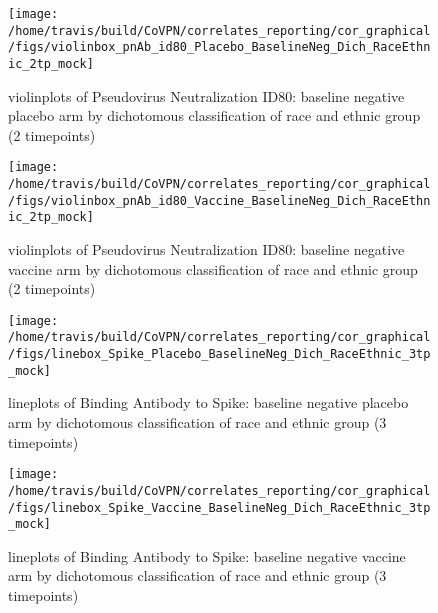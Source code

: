 \documentclass[]{book}
\theoremstyle{definition}
\theoremstyle{definition}
\theoremstyle{definition}
\newcommand{\1}{\mathbbm{1}}
\begin{document}
\clearpage
\begin{figure}[H]

{\centering \texttt{[image: /home/travis/build/CoVPN/correlates\_reporting/cor\_graphical/figs/violinbox\_pnAb\_id80\_Placebo\_BaselineNeg\_Dich\_RaceEthnic\_2tp\_mock]} 

}

\caption{violinplots of Pseudovirus Neutralization ID80: baseline negative placebo arm by dichotomous classification of race and ethnic group (2 timepoints)}\label{fig:unnamed-chunk-233}
\end{figure}

\clearpage
\begin{figure}[H]

{\centering \texttt{[image: /home/travis/build/CoVPN/correlates\_reporting/cor\_graphical/figs/violinbox\_pnAb\_id80\_Vaccine\_BaselineNeg\_Dich\_RaceEthnic\_2tp\_mock]} 

}

\caption{violinplots of Pseudovirus Neutralization ID80: baseline negative vaccine arm by dichotomous classification of race and ethnic group (2 timepoints)}\label{fig:unnamed-chunk-234}
\end{figure}

\clearpage
\begin{figure}[H]

{\centering \texttt{[image: /home/travis/build/CoVPN/correlates\_reporting/cor\_graphical/figs/linebox\_Spike\_Placebo\_BaselineNeg\_Dich\_RaceEthnic\_3tp\_mock]} 

}

\caption{lineplots of Binding Antibody to Spike: baseline negative placebo arm by dichotomous classification of race and ethnic group (3 timepoints)}\label{fig:unnamed-chunk-235}
\end{figure}

\clearpage
\begin{figure}[H]

{\centering \texttt{[image: /home/travis/build/CoVPN/correlates\_reporting/cor\_graphical/figs/linebox\_Spike\_Vaccine\_BaselineNeg\_Dich\_RaceEthnic\_3tp\_mock]} 

}

\caption{lineplots of Binding Antibody to Spike: baseline negative vaccine arm by dichotomous classification of race and ethnic group (3 timepoints)}\label{fig:unnamed-chunk-236}
\end{figure}
\end{document}
